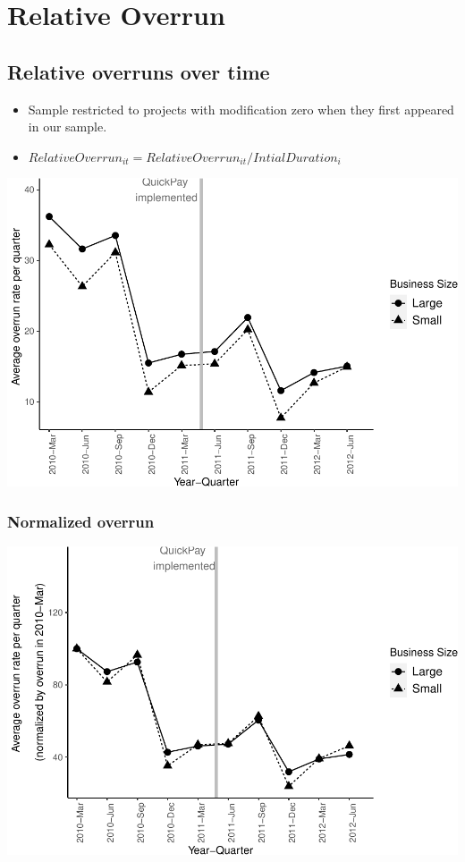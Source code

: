 \documentclass[
]{article}
\begin{document}
\hypertarget{relative-overrun}{%
\section{Relative Overrun}\label{relative-overrun}}

\hypertarget{relative-overruns-over-time}{%
\subsection{Relative overruns over
time}\label{relative-overruns-over-time}}

\begin{itemize}
\item
  Sample restricted to projects with modification zero when they first
  appeared in our sample.
\item
  \(RelativeOverrun_{it} = RelativeOverrun_{it}/IntialDuration_i\)
\end{itemize}

\includegraphics{qp_first_budget_overrun_files/figure-latex/plot_relative_overrun-1.pdf}

\hypertarget{normalized-overrun-2}{%
\subsubsection{Normalized overrun}\label{normalized-overrun-2}}

\includegraphics{qp_first_budget_overrun_files/figure-latex/normalized_relative_plot-1.pdf}
\end{document}

